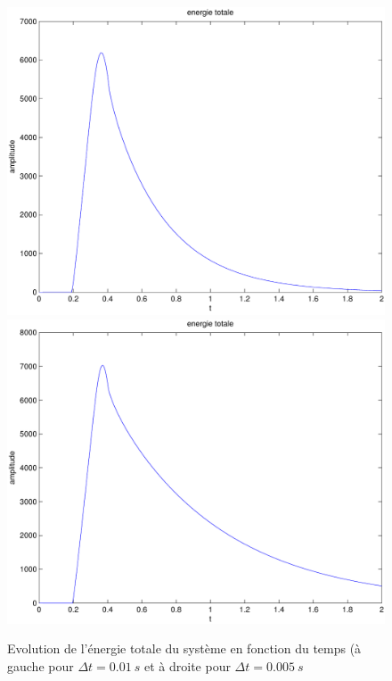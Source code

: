 \documentclass[]{article}
\begin{document}
\begin{figure}
\begin{center}
 \includegraphics[scale=0.4]{Figures/fig3_mod.pdf}
\includegraphics[scale=0.4]{Figures/fig3_mod2.pdf}
\caption{Evolution de l'énergie totale du système en fonction du temps (à
gauche pour $\Delta t=0.01\ s$ et à droite pour $\Delta t=0.005\ s$}
\label{enerimp}
\end{center}
\end{figure}
\end{document}
